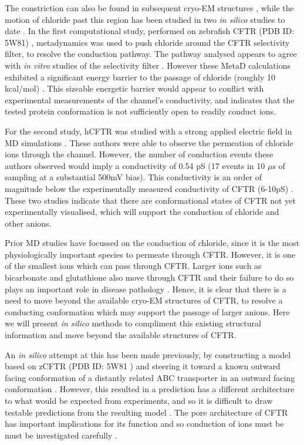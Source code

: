 The constriction can also be found in subsequent cryo-EM structures \cite{liu2019, fiedorczuk2022}, while the motion of chloride past this region has been studied in two \textit{in silico} studies to date \cite{farkas2020, zeng2021}. In the first computational study, performed on zebrafish CFTR (PDB ID: 5W81) \cite{zhang2017a}, metadynamics was used to push chloride around the CFTR selectivity filter, to resolve the conduction pathway. The pathway analysed appears to agree with \textit{in vitro} studies of the selectivity filter \cite{linsdell2016}. However these MetaD calculations exhibited a significant energy barrier to the passage of chloride (roughly 10 kcal/mol) \cite{farkas2020}. This sizeable energetic barrier would appear to conflict with experimental measurements of the channel's conductivity, and indicates that the tested protein conformation is not sufficiently open to readily conduct ions. 

For the second study, hCFTR was studied with a strong applied electric field in MD simulations \cite{zeng2021}. These authors were able to observe the permeation of chloride ions through the channel. However, the number of conduction events these authors observed would imply a conductivity of 0.54 pS (17 events in 10 $\mu$s of sampling at a substantial 500mV bias). This conductivity is an order of magnitude below the experimentally measured conductivity of CFTR (6-10pS) \cite{gong2004, lee2007, linsdell2001, sheppard1999}. These two studies indicate that there are conformational states of CFTR not yet experimentally visualised, which will support the conduction of chloride and other anions. 

Prior MD studies have focussed on the conduction of chloride, since it is the most physiologically important species to permeate through CFTR. However, it is one of the smallest ions which can pass through CFTR. Larger ions such as bicarbonate and glutathione also move through CFTR and their failure to do so plays an important role in disease pathology \cite{gao1999, kogan2003, linsdell1998, tang2009, larusch2014, jun2016}. Hence, it is clear that there is a need to move beyond the available cryo-EM structures of CFTR, to resolve a conducting conformation which may support the passage of larger anions. Here we will present \textit{in silico} methods to compliment this existing structural information and move beyond the available structures of CFTR. 

An \textit{in silico} attempt at this has been made previously, by constructing a model based on zCFTR (PDB ID: 5W81 \cite{zhang2017a}) and steering it toward a known outward facing conformation of a distantly related ABC transporter in an outward facing conformation \cite{hoffmann2018, dawson2006}. However, this resulted in a prediction has a different architecture to what would be expected from experiments, and so it is difficult to draw testable predictions from the resulting model \cite{hoffmann2018, linsdell2018}. The pore architecture of CFTR has important implications for its function and so conduction of ions must be must be investigated carefully \cite{linsdell2016, linsdell2018}. 

